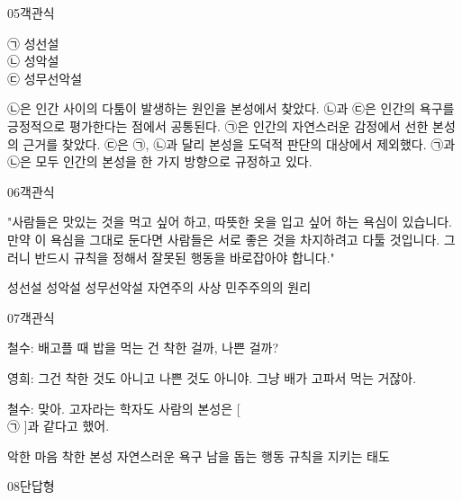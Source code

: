 \documentclass[fs9,seriesFre]{korfarm-base}
\begin{document}
\begin{kfQBlock}{05}{객관식}
\begin{kfEvidence}㉠ 성선설 \\\relax
㉡ 성악설 \\\relax
㉢ 성무선악설\end{kfEvidence}
\begin{kfChoices}
\kfChoice ㉡은 인간 사이의 다툼이 발생하는 원인을 본성에서 찾았다.
\kfChoice ㉡과 ㉢은 인간의 욕구를 긍정적으로 평가한다는 점에서 공통된다.
\kfChoice ㉠은 인간의 자연스러운 감정에서 선한 본성의 근거를 찾았다.
\kfChoice ㉢은 ㉠, ㉡과 달리 본성을 도덕적 판단의 대상에서 제외했다.
\kfChoice ㉠과 ㉡은 모두 인간의 본성을 한 가지 방향으로 규정하고 있다.
\end{kfChoices}
\end{kfQBlock}
\begin{kfQBlock}{06}{객관식}
\begin{kfEvidence}"사람들은 맛있는 것을 먹고 싶어 하고, 따뜻한 옷을 입고 싶어 하는 욕심이 있습니다. 만약 이 욕심을 그대로 둔다면 사람들은 서로 좋은 것을 차지하려고 다툴 것입니다. 그러니 반드시 규칙을 정해서 잘못된 행동을 바로잡아야 합니다."\end{kfEvidence}
\begin{kfChoices}
\kfChoice 성선설
\kfChoice 성악설
\kfChoice 성무선악설
\kfChoice 자연주의 사상
\kfChoice 민주주의의 원리
\end{kfChoices}
\end{kfQBlock}
\begin{kfQBlock}{07}{객관식}
\begin{kfEvidence}철수: 배고플 때 밥을 먹는 건 착한 걸까, 나쁜 걸까?

영희: 그건 착한 것도 아니고 나쁜 것도 아니야. 그냥 배가 고파서 먹는 거잖아.

철수: 맞아. 고자라는 학자도 사람의 본성은 [ \\\relax
㉠    ]과 같다고 했어.\end{kfEvidence}
\begin{kfChoices}
\kfChoice 악한 마음
\kfChoice 착한 본성
\kfChoice 자연스러운 욕구
\kfChoice 남을 돕는 행동
\kfChoice 규칙을 지키는 태도
\end{kfChoices}
\end{kfQBlock}
\begin{kfQBlock}{08}{단답형}
\end{kfQBlock}
\end{document}
